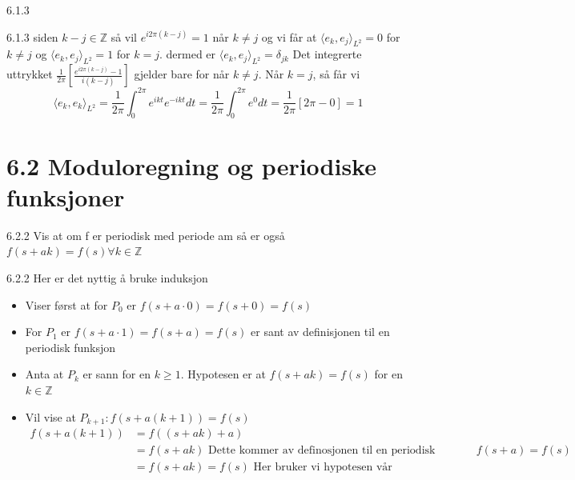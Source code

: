 \documentclass[a4paper,norsk]{article}
\renewcommand{\geq}{\geqslant}
\begin{document}
\begin{oppgavebox}{6.1.3}{}
\begin{proofbox}{6.1.3}{}
siden $ k-j  \in \mathbb{Z}$ så vil $ e^{i 2\pi \left( k -j \right) } = 1 $ når $ k \neq j $  og vi får at $ \langle e_k, e_j \rangle_{ L^2 } = 0  $ for $ k\neq j $ og $ \langle e_k, e_j \rangle_{ L^2 } = 1  $ for $ k = j $. dermed er $ \langle e_k, e_j \rangle_{ L^2 } = \delta_{jk}  $ Det integrerte uttrykket $ \frac{ 1 }{ 2\pi } \left[ \frac{ e^{i2\pi \left( k - j \right)  } - 1}{ i \left( k-j \right)  } \right]  $ gjelder bare for når $ k \neq j $. Når $ k=j $, så får vi
\[
    \langle e_k, e_k \rangle_{ L^2 }  = \frac{ 1 }{ 2\pi } \int_{0}^{2\pi} e^{ikt} e^{-ikt}dt = \frac{ 1 }{ 2\pi } \int_{0}^{2\pi} e^0 dt = \frac{ 1 }{ 2\pi } \left[ 2\pi - 0 \right]   = 1
\]
\end{proofbox}   
\end{oppgavebox}


\section*{6.2 Moduloregning og periodiske funksjoner}

\begin{oppgavebox}{6.2.2}{}
Vis at om f er periodisk med periode am så er også $ f(s + ak) = f(s) \forall k \in \mathbb{Z} $ 

\begin{proofbox}{6.2.2}{}
Her er det nyttig å bruke induksjon
\begin{itemize}
  \item Viser først at for $ P_0 $ er $ f(s + a \cdot 0) = f(s + 0) = f(s) $  
  \item For $ P_1 $ er $ f(s + a \cdot 1) = f(s+a) = f(s) $  er sant av definisjonen til en periodisk funksjon
  \item Anta at $ P_k $  er sann for en $ k \geq 1 $. Hypotesen er at $ f(s + ak) = f(s)  $ for en $ k \in \mathbb{Z} $ 
  \item Vil vise at $ P_{k+1}: f(s + a \left( k+1 \right) ) = f(s) $
  \begin{align*}
    f(s + a \left( k+1 \right)) &= f( \left( s + ak \right) + a) \\
    &=   f \left( s + ak \right) \text{ Dette kommer av definosjonen til en periodisk funksjon } f(s+a) = f(s) \\
    &= f \left( s + ak \right) = f(s) \text{ Her bruker vi hypotesen vår} 
  \end{align*}
  
\end{itemize}
\end{proofbox}
\end{oppgavebox}
\end{document}
